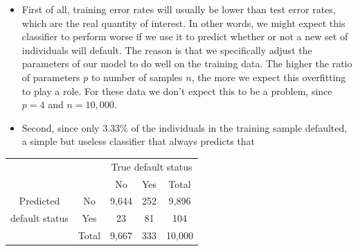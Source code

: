 \documentclass[10pt]{article}
\begin{document}
\begin{itemize}
  \item First of all, training error rates will usually be lower than test error rates, which are the real quantity of interest. In other words, we might expect this classifier to perform worse if we use it to predict whether or not a new set of individuals will default. The reason is that we specifically adjust the parameters of our model to do well on the training data. The higher the ratio of parameters $p$ to number of samples $n$, the more we expect this overfitting to play a role. For these data we don't expect this to be a problem, since $p=4$ and $n=10,000$.
  \item Second, since only $3.33 \%$ of the individuals in the training sample defaulted, a simple but useless classifier that always predicts that
\end{itemize}

\begin{center}
\begin{tabular}{cc|cc|c}
\hline
 &  & \multicolumn{3}{|c}{True default status} \\
 &  & No & Yes & Total \\
\hline
Predicted & No & 9,644 & 252 & 9,896 \\
default status & Yes & 23 & 81 & 104 \\
\cline { 2 - 5 }
 & Total & 9,667 & 333 & 10,000 \\
\hline
\end{tabular}
\end{center}
\end{document}
